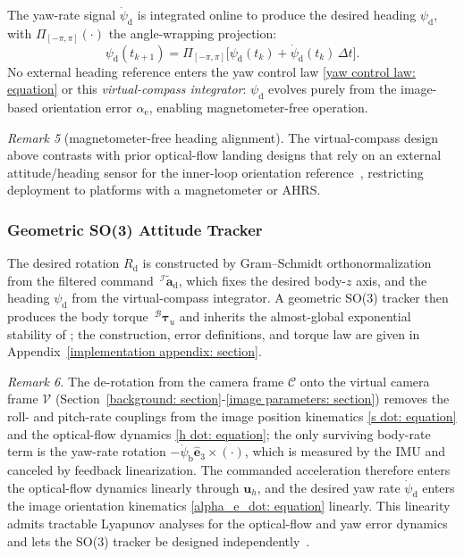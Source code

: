 \documentclass{IEEEtaes}
\begin{document}
The yaw-rate signal $\dot{\psi}_\text{d}$ is integrated online to produce the desired heading $\psi_\text{d}$, with $\Pi_{[-\pi,\pi]}(\cdot)$ the angle-wrapping projection:
\begin{equation} \label{psi d integrator: equation}
    \psi_\text{d}(t_{k+1}) = \Pi_{[-\pi,\pi]}\!\big[\psi_\text{d}(t_k) + \dot{\psi}_\text{d}(t_k)\,\Delta t\big].
\end{equation}
No external heading reference enters the yaw control law \eqref{yaw control law: equation} or this \emph{virtual-compass integrator}: $\psi_\text{d}$ evolves purely from the image-based orientation error $\alpha_\text{e}$, enabling magnetometer-free operation.

\textit{Remark 5} (magnetometer-free heading alignment). The virtual-compass design above contrasts with prior optical-flow landing designs that rely on an external attitude/heading sensor for the inner-loop orientation reference~\cite{herisse2012}, restricting deployment to platforms with a magnetometer or AHRS.

\subsubsection{Geometric SO(3) Attitude Tracker} \label{so3 inner loop: section}
The desired rotation $R_\text{d}$ is constructed by Gram--Schmidt orthonormalization from the filtered command $\,^\mathcal{I}\tilde{\boldsymbol{a}}_\text{d}$, which fixes the desired body-$z$ axis, and the heading $\psi_\text{d}$ from the virtual-compass integrator. A geometric SO(3) tracker then produces the body torque $\,^\mathcal{B}\boldsymbol{\tau}_u$ and inherits the almost-global exponential stability of \cite[Thm.~3.1]{lee2010}; the construction, error definitions, and torque law are given in Appendix~\ref{implementation appendix: section}.

\textit{Remark 6.} The de-rotation from the camera frame $\mathcal{C}$ onto the virtual camera frame $\mathcal{V}$ (Section~\ref{background: section}-\ref{image parameters: section}) removes the roll- and pitch-rate couplings from the image position kinematics \eqref{s dot: equation} and the optical-flow dynamics \eqref{h dot: equation}; the only surviving body-rate term is the yaw-rate rotation $-\dot{\psi}_\text{b}\hat{\boldsymbol{e}}_3\times(\cdot)$, which is measured by the IMU and canceled by feedback linearization. The commanded acceleration therefore enters the optical-flow dynamics linearly through $\boldsymbol{u}_h$, and the desired yaw rate $\dot{\psi}_\text{d}$ enters the image orientation kinematics \eqref{alpha_e_dot: equation} linearly. This linearity admits tractable Lyapunov analyses for the optical-flow and yaw error dynamics and lets the SO(3) tracker be designed independently~\cite{fink2017, xie2016_2}.
\end{document}
